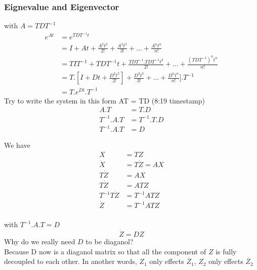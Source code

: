 \subsubsection{Eignevalue and Eigenvector}
with $A = TDT^{-1}$
\begin{equation}
  \begin{aligned}
    e^{At}  & = e^{TDT^{-1}t} \\
            & = I + At + \frac{ A^{2}t^{2} }{2!} + \frac{ A^{3}t^{3} }{3!} + \ldots + \frac{ A^{n}t^{n} }{n!} \\
            & = TIT^{-1} + TDT^{-1}t + \frac{ TDT^{-1}.TDT^{-1}t^{2} }{2!} + \ldots + \frac{ (TDT^{-1})^{n}t^{n} }{n!}\\
            & = T.[I + Dt + \frac{D^{2}t^2}{2!}] + \frac{D^{3}t^3}{3!} + \ldots + \frac{D^{n}t^{n}}{n!} ].T^{-1}\\
            & = T.e^{Dt}.T^{-1}
  \end{aligned}
\end{equation}  
Try to write the system in this form AT = TD (8:19 timestamp)
\begin{equation}
  \begin{aligned}
    A.T  & = T.D \\
    T^{-1}.A.T  & = T^{-1}.T.D \\
    T^{-1}.A.T & = D
  \end{aligned}  
\end{equation} 

We have
\begin{equation}
  \begin{aligned}
    X &= TZ \\
    \dot{X} &= T\dot{Z} = AX \\
    T\dot{Z} &= AX \\
    T\dot{Z} &= ATZ \\
    T^{-1}T\dot{Z} &= T^{-1}ATZ \\
    \dot{Z} &= T^{-1}ATZ \\
  \end{aligned}  
\end{equation} 

with $ T^{-1}.A.T = D $
\begin{equation}
  \dot{Z} = DZ
\end{equation}
Why do we really need $D$ to be diaganol?
\\Because D now is a diaganol matrix 
so that all the component of $Z$ is fully decoupled to each other.
In another words,
$Z_{1}$ only effects $\dot{Z_{1}}$, $Z_{2}$ only effects $\dot{Z_{2}}$

